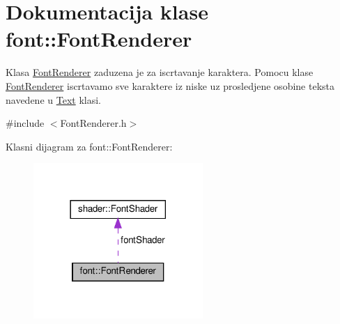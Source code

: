 \hypertarget{classfont_1_1FontRenderer}{}\section{Dokumentacija klase font\+:\+:Font\+Renderer}
\label{classfont_1_1FontRenderer}


Klasa \hyperlink{classfont_1_1FontRenderer}{Font\+Renderer} zaduzena je za iscrtavanje karaktera. Pomocu klase \hyperlink{classfont_1_1FontRenderer}{Font\+Renderer} iscrtavamo sve karaktere iz niske uz prosledjene osobine teksta navedene u \hyperlink{classfont_1_1Text}{Text} klasi.  




{\ttfamily \#include $<$Font\+Renderer.\+h$>$}



Klasni dijagram za font\+:\+:Font\+Renderer\+:
\nopagebreak
\begin{figure}[H]
\begin{center}
\leavevmode
\includegraphics[width=182pt]{classfont_1_1FontRenderer__coll__graph}
\end{center}
\end{figure}
